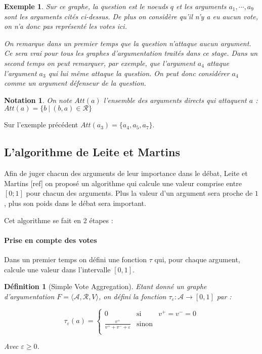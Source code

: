 \documentclass[11pt]{article}
\theoremstyle{defi}
\newtheorem{definition}{Définition}[section]
\theoremstyle{not}
\newtheorem{notation}{Notation}[section]
\theoremstyle{prob}
\newtheorem{exemple}{Exemple}[section]
\begin{document}
\begin{exemple}
      Sur ce graphe, la question est le noeuds $q$ et les arguments $a_1, \cdots, a_9$ sont les arguments cités ci-dessus.
      De plus on considère qu'il n'y a eu aucun vote, on n'a donc pas représenté les votes ici.

      On remarque dans un premier temps que la question n'attaque aucun argument.
      Ce sera vrai pour tous les graphes d'argumentation traités dans ce stage.
      Dans un second temps on peut remarquer, par exemple, que l'argument $a_4$ attaque l'argument $a_3$ qui lui même attaque la question.
      On peut donc considérer $a_4$ comme un argument défenseur de la question.

    \end{exemple}

    \begin{notation}
      On note $Att(a)$ l'ensemble des arguments directs qui attaquent $a$ :
      $Att(a) = \{b\ |\ (b, a)\in \mathcal{R}\}$
    \end{notation}

    Sur l'exemple précédent $Att(a_3) = \{a_4, a_5, a_7\}$.

    \subsection{L'algorithme de Leite et Martins}
      Afin de juger chacun des arguments de leur importance dans le débat, Leite et Martins [ref] on proposé un algorithme qui calcule une valeur comprise entre $[0; 1]$ pour chacun des arguments. Plus la valeur d'un argument sera proche de $1$, plus son poids dans le débat sera important.

      Cet algorithme se fait en 2 étapes :

      \paragraph{Prise en compte des votes}
      Dans un premier temps on défini une fonction $\tau$ qui, pour chaque argument, calcule une valeur dans l'intervalle $[0, 1]$.

        \begin{definition}[Simple Vote Aggregation]
          Etant donné un graphe d'argumentation $F = \langle \mathcal{A}, \mathcal{R}, V \rangle$, on défini la fonction $\tau_\varepsilon : \mathcal{A} \rightarrow [0, 1]$ par :

          $$\tau_\varepsilon(a) = \left\{
            \begin{array}{lll}
              0 & \mbox{si } & v^+ = v^- = 0\\
              \frac{v^+}{v^+ + v^- + \varepsilon} & \mbox{sinon} & \\
            \end{array}\right.$$

          Avec $\varepsilon \geq 0$.
        \end{definition}
\end{document}
